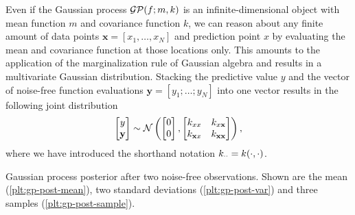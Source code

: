 Even if the Gaussian process $\mathcal{GP}(f;m,k)$ is an infinite-dimensional object with
mean function $m$ and covariance function $k$, we can reason about any finite
amount of data points $\mathbf{x}=[x_1, \dots, x_N]$ and prediction point $x$
by evaluating the mean and covariance function at those locations only. This
amounts to the application of the marginalization rule of Gaussian algebra
\cite[]{Bishop:2006:Pattern} and results in a multivariate Gaussian
distribution. Stacking the predictive value $y$ and the vector of noise-free
function evaluations $\mathbf{y}=[y_1; \dots; y_N]$ into one vector results in
the following joint distribution
\begin{equation}
  \label{eq:joint-gaussian}
  \begin{bmatrix}y\\\mathbf{y}\end{bmatrix}
  \sim \N\left(\begin{bmatrix}0\\0\end{bmatrix},
  \begin{bmatrix}\k_{xx} & \k_{x\mathbf{x}} \\
    \k_{\mathbf{x}x} & \k_{\mathbf{x}\mathbf{x}} \end{bmatrix} \right),
\end{equation}
where we have introduced the shorthand notation $k_{\cdot\cdot} =
k(\cdot,\cdot)$.

\begin{marginfigure}[28mm]
\setlength\figurewidth{\columnwidth}%
\setlength\figureheight{0.618\figurewidth}%
  \caption[Gaussian process posterior after two noise-free observations.]
  {Gaussian process posterior after two noise-free observations.
Shown are the mean (\ref*{plt:gp-post-mean}), two standard deviations
(\ref*{plt:gp-post-var}) and three samples (\ref*{plt:gp-post-sample}).}
  \label{fig:gauss-proc-post}
\end{marginfigure}


